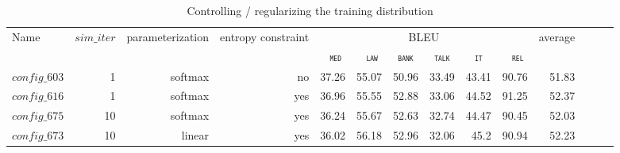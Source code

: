 \documentclass[11pt,a4paper]{article}
\newcommand{\domain}[1]{\texttt{\textsc{#1}}}
\newcommand{\system}[1]{\texttt{{#1}}}
\begin{document}
\begin{table}
  \centering %
  \begin{adjustbox}{width=1.0\textwidth,center}
  \begin{tabular}{|p{2.0cm}|*{13}{r|}} \hline
    \multirow{2}{*}{Name} & \multirow{2}{*}{$sim\_iter$} & \multirow{2}{*}{parameterization} & \multirow{2}{*}{entropy constraint} & \multicolumn{6}{|c|}{BLEU} & \multirow{2}{*}{average} \\ \cline{5-10}	
   & & & & \multicolumn{1}{c|}{\domain{ med}} & \multicolumn{1}{c|}{\domain{ law}} & \multicolumn{1}{c|}{\domain{bank}} & \multicolumn{1}{c|}{\domain{talk}} & \multicolumn{1}{c|}{\domain{ it }} & \multicolumn{1}{c|}{\domain{ rel}} &  \\
    \hline
    \system{$config\_603$} & 1 & softmax & no & 37.26& 55.07& 50.96& 33.49& 43.41& 90.76& 51.83\\
    \system{$config\_616$} & 1 & softmax & yes & 36.96& 55.55& 52.88& 33.06& 44.52& 91.25& 52.37 \\
    \system{$config\_675$} & 10 & softmax & yes & 36.24& 55.67& 52.63& 32.74& 44.47& 90.45& 52.03\\
    \system{$config\_673$} & 10 & linear & yes & 36.02& 56.18& 52.96& 32.06& 45.2 & 90.94 & 52.23 \\
  \hline
  \end{tabular}
  \end{adjustbox}
  \caption{Controlling / regularizing the training distribution}
  \label{tab:performance}
\end{table}
\end{document}
